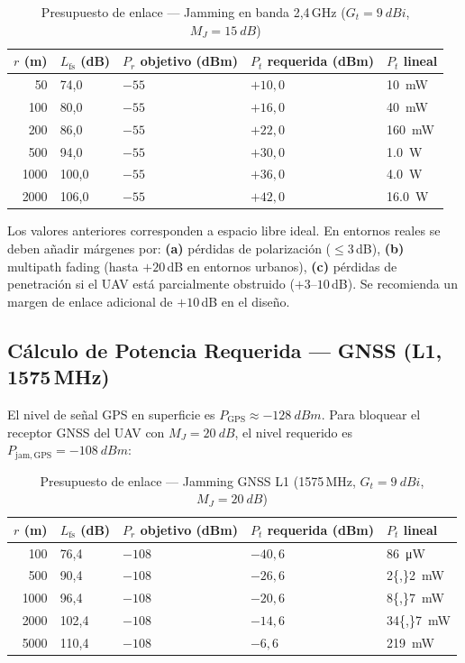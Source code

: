 \documentclass[12pt,a4paper]{article}
\begin{document}
\begin{table}[H]
\centering
\caption{Presupuesto de enlace — Jamming en banda 2,4\,GHz ($G_t = \SI{9}{dBi}$, $M_J = \SI{15}{dB}$)}
\label{tab:budget_24}
\renewcommand{\arraystretch}{1.3}
\begin{tabularx}{\textwidth}{rXXXX}
\toprule
$r$ (m) &
$L_\mathrm{fs}$ (dB) &
$P_r$ objetivo (dBm) &
$P_t$ requerida (dBm) &
$P_t$ lineal \\
\midrule
50    & 74,0  & $-55$ & $+10,0$ & \SI{10}{mW}  \\
100   & 80,0  & $-55$ & $+16,0$ & \SI{40}{mW}  \\
200   & 86,0  & $-55$ & $+22,0$ & \SI{160}{mW} \\
500   & 94,0  & $-55$ & $+30,0$ & \SI{1,0}{W}  \\
1000  & 100,0 & $-55$ & $+36,0$ & \SI{4,0}{W}  \\
2000  & 106,0 & $-55$ & $+42,0$ & \SI{16,0}{W} \\
\bottomrule
\end{tabularx}
\end{table}

\begin{notatec}
  Los valores anteriores corresponden a espacio libre ideal.
  En entornos reales se deben añadir márgenes por:
  \textbf{(a)} pérdidas de polarización ($\leq 3$\,dB),
  \textbf{(b)} multipath fading (hasta $+20$\,dB en entornos urbanos),
  \textbf{(c)} pérdidas de penetración si el UAV está parcialmente
  obstruido ($+3$–$10$\,dB).
  Se recomienda un margen de enlace adicional de $+10$\,dB en el diseño.
\end{notatec}

\subsection{Cálculo de Potencia Requerida — GNSS (L1, 1575\,MHz)}

El nivel de señal GPS en superficie es $P_\mathrm{GPS} \approx \SI{-128}{dBm}$.
Para bloquear el receptor GNSS del UAV con $M_J = \SI{20}{dB}$, el nivel
requerido es $P_\mathrm{jam,GPS} = \SI{-108}{dBm}$:

\begin{table}[H]
\centering
\caption{Presupuesto de enlace — Jamming GNSS L1 (1575\,MHz, $G_t = \SI{9}{dBi}$, $M_J = \SI{20}{dB}$)}
\label{tab:budget_gps}
\renewcommand{\arraystretch}{1.3}
\begin{tabularx}{\textwidth}{rXXXX}
\toprule
$r$ (m) &
$L_\mathrm{fs}$ (dB) &
$P_r$ objetivo (dBm) &
$P_t$ requerida (dBm) &
$P_t$ lineal \\
\midrule
100  & 76,4  & $-108$ & $-40{,}6$ & \SI{86}{\micro W}  \\
500  & 90,4  & $-108$ & $-26{,}6$ & \SI{2{,}2}{mW}     \\
1000 & 96,4  & $-108$ & $-20{,}6$ & \SI{8{,}7}{mW}     \\
2000 & 102,4 & $-108$ & $-14{,}6$ & \SI{34{,}7}{mW}    \\
5000 & 110,4 & $-108$ & $-6{,}6$  & \SI{219}{mW}        \\
\bottomrule
\end{tabularx}
\end{table}
\end{document}
